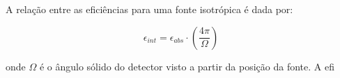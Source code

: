 \documentclass[11pt,a4paper]{article}
\begin{document}
		A relação entre as eficiências para uma fonte isotrópica é dada por:

			\begin{equation}
					\epsilon_{int} = \epsilon_{abs} \cdot \left(\frac{4 \pi}{\Omega}\right)
			\end{equation}

		\noindent onde $\Omega$ é o ângulo sólido do detector visto a partir da posição da fonte. A efi

\end{document}
